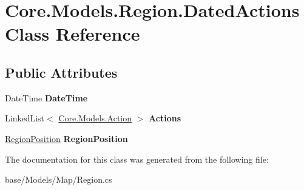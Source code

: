 \hypertarget{classCore_1_1Models_1_1Region_1_1DatedActions}{\section{Core.\-Models.\-Region.\-Dated\-Actions Class Reference}
\label{classCore_1_1Models_1_1Region_1_1DatedActions}
}
\subsection*{Public Attributes}
\begin{DoxyCompactItemize}
\item 
\hypertarget{classCore_1_1Models_1_1Region_1_1DatedActions_aacd25bcefeefe28cab23509157ceafbf}{Date\-Time {\bfseries Date\-Time}}\label{classCore_1_1Models_1_1Region_1_1DatedActions_aacd25bcefeefe28cab23509157ceafbf}

\item 
\hypertarget{classCore_1_1Models_1_1Region_1_1DatedActions_aeaa886f5b32791bbd8d3a98b9712c1e1}{Linked\-List$<$ \hyperlink{classCore_1_1Models_1_1Action}{Core.\-Models.\-Action} $>$ {\bfseries Actions}}\label{classCore_1_1Models_1_1Region_1_1DatedActions_aeaa886f5b32791bbd8d3a98b9712c1e1}

\item 
\hypertarget{classCore_1_1Models_1_1Region_1_1DatedActions_af5d142eb58d87b6d923f221b18b3bb20}{\hyperlink{classCore_1_1Models_1_1RegionPosition}{Region\-Position} {\bfseries Region\-Position}}\label{classCore_1_1Models_1_1Region_1_1DatedActions_af5d142eb58d87b6d923f221b18b3bb20}

\end{DoxyCompactItemize}


The documentation for this class was generated from the following file\-:\begin{DoxyCompactItemize}
\item 
base/\-Models/\-Map/Region.\-cs\end{DoxyCompactItemize}
